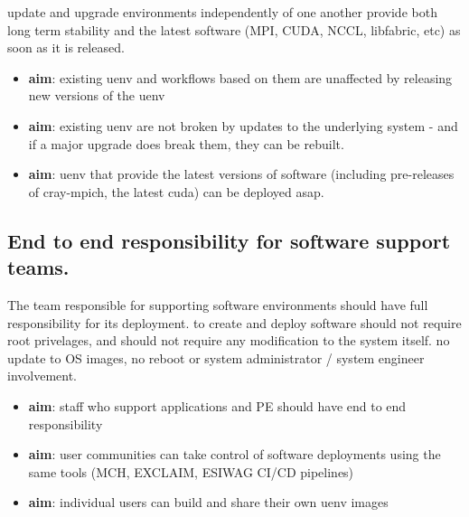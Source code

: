 update and upgrade environments independently of one another
provide both long term stability and the latest software (MPI, CUDA, NCCL, libfabric, etc) as soon as it is released.

\begin{itemize}
    \item \textbf{aim}: existing uenv and workflows based on them are unaffected by releasing new versions of the uenv
    \item \textbf{aim}: existing uenv are not broken by updates to the underlying system - and if a major upgrade does break them, they can be rebuilt.
    \item \textbf{aim}: uenv that provide the latest versions of software (including pre-releases of cray-mpich, the latest cuda) can be deployed asap.
\end{itemize}

\subsection{End to end responsibility for software support teams.}

The team responsible for supporting software environments should have full responsibility for its deployment.
to create and deploy software should not require root privelages, and should not require any modification to the system itself.
no update to OS images, no reboot or system administrator / system engineer involvement.

\begin{itemize}
    \item \textbf{aim}: staff who support applications and PE should have end to end responsibility
    \item \textbf{aim}: user communities can take control of software deployments using the same tools (MCH, EXCLAIM, ESIWAG CI/CD pipelines)
    \item \textbf{aim}: individual users can build and share their own uenv images
\end{itemize}
